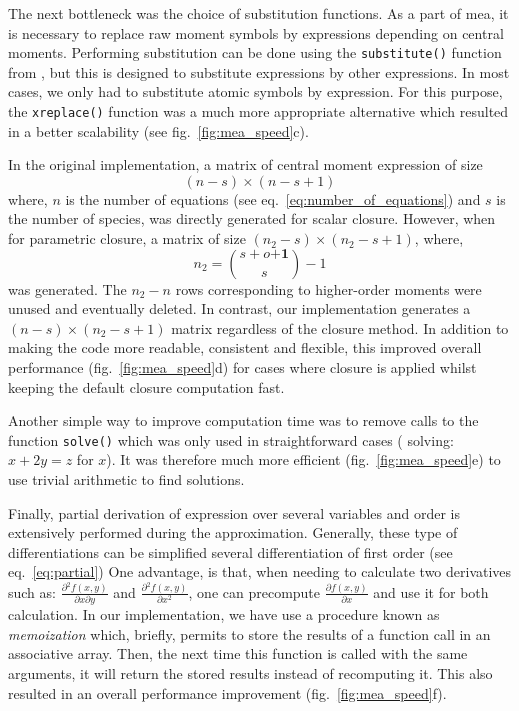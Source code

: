 The next bottleneck was the choice of substitution functions.
As a part of \gls{mea}, it is necessary to replace raw moment symbols by expressions depending on central moments.
Performing substitution can be done using the \texttt{substitute()} function from \sympy, but this is designed to substitute expressions by other expressions.
In most cases, we only had to substitute atomic symbols by expression.
For this purpose, the \texttt{xreplace()} function was a much more appropriate alternative which resulted in a better scalability (see fig.~\ref{fig:mea_speed}c).

In the original implementation, a matrix of central moment expression of size
\[(n-s) \times (n-s + 1)\]
where,
$n$ is the number of equations (see eq.~\ref{eq:number_of_equations}) and
$s$ is the number of species,
was directly generated for scalar closure.
However, when for parametric closure, a matrix of size $(n_2-s) \times (n_2-s + 1)$,
where,
\[n_2={{s+o \mathbf{+1}} \choose {s}} -1\]
was generated.
The $n_2 - n$ rows corresponding to higher-order moments were unused and eventually deleted.
In contrast, our implementation generates a $(n-s) \times (n_2-s + 1)$ matrix regardless of the closure method.
In addition to making the code more readable, consistent and flexible, this improved overall performance (fig.~\ref{fig:mea_speed}d)
for cases where closure is applied whilst keeping the default closure computation fast.

Another simple way to improve computation time was to remove calls to the function \texttt{solve()} which was only used in straightforward cases
(\eg{} solving: $x + 2y = z$ for $x$).
It was therefore much more efficient (fig.~\ref{fig:mea_speed}e) to use trivial arithmetic to find solutions.

Finally, partial derivation of expression over several variables and order is extensively performed during the approximation.
Generally, these type of differentiations can be simplified several differentiation of first order (see eq.~\ref{eq:partial})
One advantage, is that, when needing to calculate two derivatives such as: $\frac{\partial{} ^ 2 f(x,y)}{\partial{} x \partial{} y}$ and $\frac{\partial{} ^ 2 f(x,y)}{\partial{} x^2}$,
one can precompute $\frac{\partial{} f(x,y)}{\partial{} x}$ and use it for both calculation.
In our implementation, we have use a procedure known as \emph{memoization} which, briefly, permits to store the results of a function call in an associative array.
Then, the next time this function is called with the same arguments, it will return the stored results instead of recomputing it.
This also resulted in an overall performance improvement (fig.~\ref{fig:mea_speed}f).

